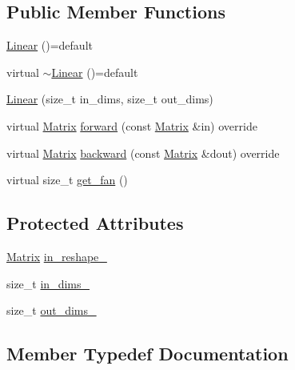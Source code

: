 \subsection*{Public Member Functions}
\begin{DoxyCompactItemize}
\item 
\mbox{\hyperlink{class_linear_a905089a6472d97cc8b1d201fdd3deef9}{Linear}} ()=default
\item 
virtual \mbox{\hyperlink{class_linear_a42109067fe1d9da36148f7c4f330b564}{$\sim$\+Linear}} ()=default
\item 
\mbox{\hyperlink{class_linear_a335a168705982b1dbf9c16b89465995e}{Linear}} (size\+\_\+t in\+\_\+dims, size\+\_\+t out\+\_\+dims)
\item 
virtual \mbox{\hyperlink{class_layer_a22b1e7286096aa62bd245536c8ebdaf1}{Matrix}} \mbox{\hyperlink{class_linear_a901668e9219a8d446b2ac60718b9c9f1}{forward}} (const \mbox{\hyperlink{class_layer_a22b1e7286096aa62bd245536c8ebdaf1}{Matrix}} \&in) override
\item 
virtual \mbox{\hyperlink{class_layer_a22b1e7286096aa62bd245536c8ebdaf1}{Matrix}} \mbox{\hyperlink{class_linear_a747db1996e723fae7c9713d4b7f303af}{backward}} (const \mbox{\hyperlink{class_layer_a22b1e7286096aa62bd245536c8ebdaf1}{Matrix}} \&dout) override
\item 
virtual size\+\_\+t \mbox{\hyperlink{class_linear_a753a7cb02a0b18e8922d23db905eb534}{get\+\_\+fan}} ()
\end{DoxyCompactItemize}
\subsection*{Protected Attributes}
\begin{DoxyCompactItemize}
\item 
\mbox{\hyperlink{class_layer_a22b1e7286096aa62bd245536c8ebdaf1}{Matrix}} \mbox{\hyperlink{class_linear_a52fbc58c45b62d75089fc627c5210455}{in\+\_\+reshape\+\_\+}}
\item 
size\+\_\+t \mbox{\hyperlink{class_linear_ae15dad7b24bbc705da10f6896188ab13}{in\+\_\+dims\+\_\+}}
\item 
size\+\_\+t \mbox{\hyperlink{class_linear_affb0e56f0ca748a62e4aa5ce5733b491}{out\+\_\+dims\+\_\+}}
\end{DoxyCompactItemize}


\subsection{Member Typedef Documentation}
\mbox{\label{class_linear_a8e402d70272bdb6406745f7ec4139f16}} 
